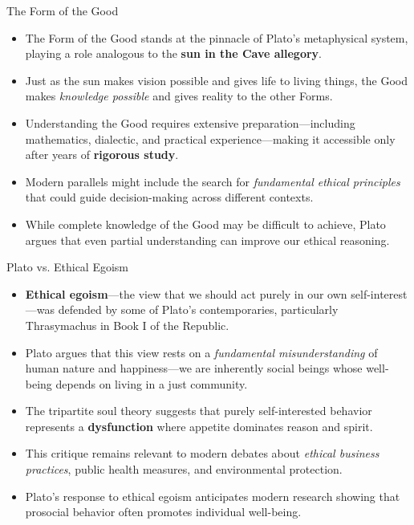\documentclass[aspectratio=169]{beamer}
\begin{document}
\begin{frame}{The Form of the Good}
\begin{itemize}
\item The Form of the Good stands at the pinnacle of Plato's metaphysical system, playing a role analogous to the \textbf{sun in the Cave allegory}.
\item Just as the sun makes vision possible and gives life to living things, the Good makes \emph{knowledge possible} and gives reality to the other Forms.
\item Understanding the Good requires extensive preparation—including mathematics, dialectic, and practical experience—making it accessible only after years of \textbf{rigorous study}.
\item Modern parallels might include the search for \emph{fundamental ethical principles} that could guide decision-making across different contexts.
\item While complete knowledge of the Good may be difficult to achieve, Plato argues that even partial understanding can improve our ethical reasoning.
\end{itemize}
\end{frame}

\begin{frame}{Plato vs. Ethical Egoism}
\begin{itemize}
\item \textbf{Ethical egoism}—the view that we should act purely in our own self-interest—was defended by some of Plato's contemporaries, particularly Thrasymachus in Book I of the Republic.
\item Plato argues that this view rests on a \emph{fundamental misunderstanding} of human nature and happiness—we are inherently social beings whose well-being depends on living in a just community.
\item The tripartite soul theory suggests that purely self-interested behavior represents a \textbf{dysfunction} where appetite dominates reason and spirit.
\item This critique remains relevant to modern debates about \emph{ethical business practices}, public health measures, and environmental protection.
\item Plato's response to ethical egoism anticipates modern research showing that prosocial behavior often promotes individual well-being.
\end{itemize}
\end{frame}
\end{document}
